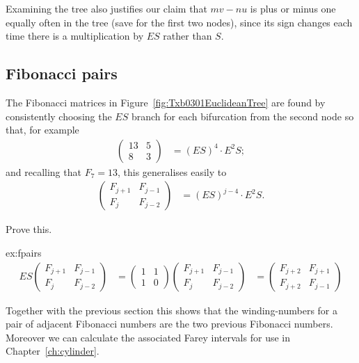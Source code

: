  Examining the tree also justifies our claim that $m v-nu$ is plus or minus one equally often in the tree (save for the first two nodes), since its sign changes each time there is a multiplication by $ES$ rather than $S$.


\subsection{Fibonacci pairs}
\label{sec:euclidean}
The Fibonacci matrices in Figure~\ref{fig:Txb0301EuclideanTree} are found by consistently choosing the $ES$ branch for each bifurcation from the second node so that, for example
\begin{align*}
	\begin{pmatrix} 
	13 & 5 
		\\
		8 & 3
	\end{pmatrix} &= 	(E S)^{{4}} \cdot E^2 S ;
\end{align*}
and recalling that $F_{7}=13$, this generalises easily to
\begin{align}
	\begin{pmatrix} 
		F_{j+1} & F_{j-1} 
		\\
		F _j & F_{j-2}
	\end{pmatrix} &= 	(E S)^{{j-4}} \cdot E^2 S.
\label{eq:FibonacciMatrix}
\end{align}
%
\begin{jExercise}\label{ex:fpairs}
	Prove this.
\end{jExercise}
%
\begin{jAnswer}{ex:fpairs} 
\begin{align}
E S \begin{pmatrix} 	F_{j+1} & F_{j-1} 	\\	F _j & F_{j-2}\end{pmatrix}
  &= 	\begin{pmatrix} 1 & 1\\1 & 0 \end{pmatrix}
\begin{pmatrix} F_{j+1} & F_{j-1} \\F _j & F_{j-2}\end{pmatrix}
&= 
\begin{pmatrix} 	F_{j+2} & F_{j+1} 	\\	F _{j+2} & F_{j-1}
\end{pmatrix}
\end{align}
\end{jAnswer}
%
Together with the previous section this shows that the winding-numbers for a pair of adjacent Fibonacci numbers are the two previous Fibonacci numbers.
Moreover we can calculate the associated Farey intervals for use in Chapter~\ref{ch:cylinder}.



